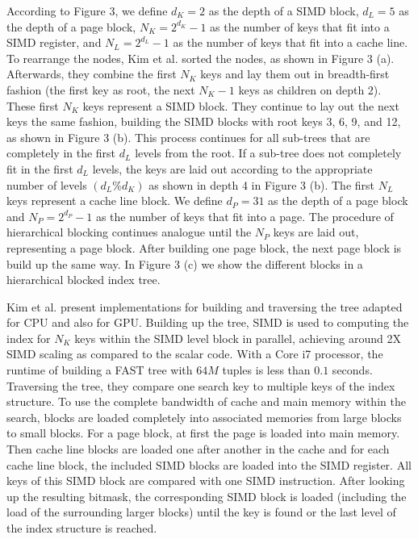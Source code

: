\documentclass[conference]{IEEEtran}
\begin{document}
According to Figure 3, we define $d_K=2$ as the depth of a SIMD block, $d_L=5$ as the depth of a page block, $N_K=2^{d_K} -1$ as the number of keys that fit into a SIMD register, and $N_L = 2^{d_L} - 1$ as the number of keys that fit into a cache line. To rearrange the nodes, Kim et al. sorted the nodes, as shown in Figure 3 (a). Afterwards, they combine the first $N_K$ keys and lay them out in breadth-first fashion (the first key as root, the next $N_K - 1$ keys as children on depth 2). These first $N_K$ keys represent a SIMD block. They continue to lay out the next keys the same fashion, building the SIMD blocks with root keys 3, 6, 9, and 12, as shown in Figure 3 (b). This process continues for all sub-trees that are completely in the first $d_L$ levels from the root. If a sub-tree does not completely fit in the first $d_L$ levels, the keys are laid out according to the appropriate number of levels $(d_L \% d_K)$ as shown in depth 4 in Figure 3 (b). The first $N_L$ keys represent a cache line block. We define $d_P=31$ as the depth of a page block and $N_P=2^{d_P} -1$ as the number of keys that fit into a page. The procedure of hierarchical blocking continues analogue until the $N_P$ keys are laid out, representing a page block. After building one page block, the next page block is build up the same way. In Figure 3 (c) we show the different blocks in a hierarchical blocked index tree.

Kim et al. present implementations for building and traversing the tree adapted for CPU and also for GPU. Building up the tree, SIMD is used to computing the index for $N_K$ keys within the SIMD level block in parallel, achieving around 2X SIMD scaling as compared to the scalar code. With a Core i7 processor, the runtime of building a FAST tree with $64M$ tuples is less than $0.1$ seconds. Traversing the tree, they compare one search key to multiple keys of the index structure. To use the complete bandwidth of cache and main memory within the search, blocks are loaded completely into associated memories from large blocks to small blocks. For a page block, at first the page is loaded into main memory. Then cache line blocks are loaded one after another in the cache and for each cache line block, the included SIMD blocks are loaded into the SIMD register. All keys of this SIMD block are compared with one SIMD instruction. After looking up the resulting bitmask, the corresponding SIMD block is loaded (including the load of the surrounding larger blocks) until the key is found or the last level of the index structure is reached.
\end{document}
